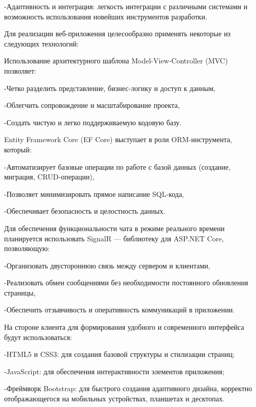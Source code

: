 {	\par \redline -Адаптивность и интеграция: легкость интеграции с различными системами и возможность использования новейших инструментов разработки.
	
	\par \redline Для реализации веб-приложения целесообразно применять некоторые из следующих технологий:
	
	\par \redline Использование архитектурного шаблона Model-View-Controller (MVC) позволяет:
	
	\par \redline -Четко разделить представление, бизнес-логику и доступ к данным,
	
	\par \redline -Облегчить сопровождение и масштабирование проекта,
	
	\par \redline -Создать чистую и легко поддерживаемую кодовую базу.
	
	\par \redline Entity Framework Core (EF Core) выступает в роли ORM-инструмента, который:
	
	\par \redline -Автоматизирует базовые операции по работе с базой данных (создание, миграция, CRUD-операции),
	
	\par \redline -Позволяет минимизировать прямое написание SQL-кода,
	
	\par \redline -Обеспечивает безопасность и целостность данных.
	
	\par \redline Для обеспечения функциональности чата в режиме реального времени планируется использовать SignalR — библиотеку для ASP.NET Core, позволяющую:
	
	\par \redline -Организовать двустороннюю связь между сервером и клиентами,
	
	\par \redline -Реализовать обмен сообщениями без необходимости постоянного обновления страницы,
	
	\par \redline -Обеспечить отзывчивость и оперативность коммуникаций в приложении.
	
	\par \redline На стороне клиента для формирования удобного и современного интерфейса будут использоваться:
	
	\par \redline -HTML5 и CSS3: для создания базовой структуры и стилизации страниц;
	
	\par \redline -JavaScript: для обеспечения интерактивности элементов приложения;
	
	\par \redline -Фреймворк Bootstrap: для быстрого создания адаптивного дизайна, корректно отображающегося на мобильных устройствах, планшетах и десктопах. 
	
	\par 
}


